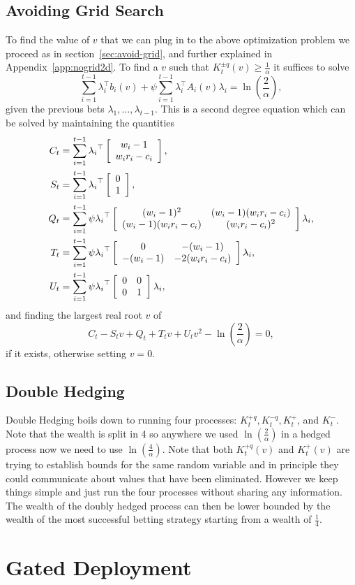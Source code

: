 \subsection{Avoiding Grid Search}
To find the value of $v$ that we can plug in to the above 
optimization problem we proceed as in section~\ref{sec:avoid-grid},
and further explained in Appendix~\ref{app:nogrid2d}.
To find a $v$ such that 
$K_t^{\pm q}(v)\geq \frac{1}{\alpha}$
it suffices to solve
\[
\sum_{i=1}^{t-1} \lambda_i^\top b_i(v) + \psi \sum_{i=1}^{t-1} \lambda_i^\top  A_i(v) \lambda_i = \ln\left(\frac{2}{\alpha}\right) ,
\]
given the previous bets $\lambda_1,\ldots, \lambda_{t-1}$. This 
is a second degree equation which can be solved by maintaining 
the quantities
\begin{align*}
C_t&= \sum_{i=1}^{t-1} {\lambda_i}^\top \left[\begin{array}{c} w_i-1 \\ w_i r_i-c_i \end{array}\right] , \\
S_t&= \sum_{i=1}^{t-1} {\lambda_i}^\top \left[\begin{array}{c} 0 \\ 1 \end{array}\right] , \\
Q_t&= \sum_{i=1}^{t-1} \psi  {\lambda_i}^\top \left[\begin{array}{cc} (w_i-1)^2 & (w_i-1)(w_i r_i-c_i) \\ (w_i-1)(w_i r_i-c_i) & (w_ir_i-c_i)^2 \end{array}\right] \lambda_i , \\
T_t&= \sum_{i=1}^{t-1} \psi  {\lambda_i}^\top \left[\begin{array}{cc} 0 & -(w_i-1) \\ -(w_i-1) & -2(w_ir_i-c_i) \end{array}\right] \lambda_i , \\
U_t&=  \sum_{i=1}^{t-1} \psi {\lambda_i}^\top \left[\begin{array}{cc} 0 & 0 \\ 0 & 1 \end{array}\right] \lambda_i ,
\end{align*}
and finding the largest real root $v$ of
\[
C_t - S_t v + Q_t + T_t v + U_t v^2 - \ln\left(\frac{2}{\alpha}\right) = 0,
\]
if it exists, otherwise setting $v=0$.

\subsection{Double Hedging}
Double Hedging boils down to running four processes: 
$K_t^{+q}, K_t^{-q}, K_t^{+}$, and $K_t^{-}$. Note 
that the wealth is split in 4 so anywhere we used 
$\ln\left(\frac{2}{\alpha}\right)$ in a hedged process
now we need to use $\ln\left(\frac{4}{\alpha}\right)$.
Note that both $K_t^{+q}(v)$ and $K_t^{+}(v)$ are trying to 
establish bounds for the same random variable and in principle
they could communicate about values that
have been eliminated. However we keep things simple
and just run the four processes without sharing 
any information. The wealth of the doubly 
hedged process can then be lower bounded by 
the wealth of the most successful betting 
strategy starting from a wealth of $\frac{1}{4}$.

\section{Gated Deployment}
\label{app:gd}
